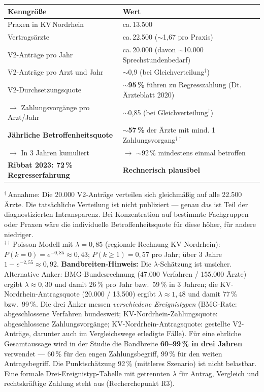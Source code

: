 \documentclass{umbruch-position}
\begin{document}
{\small
\begin{tabularx}{\textwidth}{p{6cm} X}
\toprule
\textbf{Kenngröße} & \textbf{Wert} \\
\midrule
Praxen in KV\,Nordrhein & ca.\,13.500 \\
Vertragsärzte & ca.\,22.500 ($\sim$1,67 pro Praxis) \\
V2-Anträge pro Jahr & ca.\,20.000 (davon $\sim$10.000 Sprechstundenbedarf) \\
V2-Anträge pro Arzt und Jahr & $\sim$0,9 (bei Gleichverteilung$^\dagger$) \\
\addlinespace
V2-Durchsetzungsquote & \textbf{$\sim$95\,\%} führen zu Regresszahlung (Dt.\,Ärzteblatt 2020) \\
$\to$ Zahlungsvorgänge pro Arzt/Jahr & $\sim$0,85 (bei Gleichverteilung$^\dagger$) \\
\addlinespace
\textbf{Jährliche Betroffenheitsquote} & \textbf{$\sim$57\,\%} der Ärzte mit mind. 1 Zahlungsvorgang$^{\dagger\dagger}$ \\
$\to$ In 3 Jahren kumuliert & $\to$ $\sim$92\,\% mindestens einmal betroffen \\
\addlinespace
\textbf{Ribbat 2023: 72\,\% Regresserfahrung} & \textbf{Rechnerisch plausibel} \\
\bottomrule
\end{tabularx}

$^\dagger$\,Annahme: Die 20.000 V2-Anträge verteilen sich gleichmäßig auf alle 22.500 Ärzte. Die tatsächliche Verteilung ist nicht publiziert --- genau das ist Teil der diagnostizierten Intransparenz. Bei Konzentration auf bestimmte Fachgruppen oder Praxen wäre die individuelle Betroffenheitsquote für diese höher, für andere niedriger.\\
$^{\dagger\dagger}$\,Poisson-Modell mit $\lambda = 0{,}85$ (regionale Rechnung KV Nordrhein): $P(k{=}0) = e^{-0{,}85} \approx 0{,}43$; $P(k{\geq}1) = 0{,}57$ pro Jahr; \"uber 3 Jahre $1 - e^{-2{,}55} \approx 0{,}92$. \textbf{Bandbreiten-Hinweis:} Die $\lambda$-Sch\"atzung ist unsicher. Alternative Anker: BMG-Bundesrechnung (47.000 Verfahren / 155.000 \"Arzte) ergibt $\lambda \approx 0{,}30$ und damit 26\,\% pro Jahr bzw.\ 59\,\% in 3 Jahren; die KV-Nordrhein-Antragsquote (20.000 / 13.500) ergibt $\lambda \approx 1{,}48$ und damit 77\,\% bzw.\ 99\,\%. Die drei \"Anker messen \textit{verschiedene Ereignistypen} (BMG-Rate: abgeschlossene Verfahren bundesweit; KV-Nordrhein-Zahlungsquote: abgeschlossene Zahlungsvorg\"ange; KV-Nordrhein-Antragsquote: gestellte V2-Antr\"age, darunter auch im Vergleichswege erledigte F\"alle). F\"ur eine ehrliche Gesamtaussage wird in der Studie die Bandbreite \textbf{60--99\,\% in drei Jahren} verwendet --- 60\,\% f\"ur den engen Zahlungsbegriff, 99\,\% f\"ur den weiten Antragsbegriff. Die Punktsch\"atzung 92\,\% (mittleres Szenario) ist nicht belastbar. Eine formale Drei-Ereignistyp-Tabelle mit getrennten $\lambda$ f\"ur Antrag, Vergleich und rechtskr\"aftige Zahlung steht aus (Recherchepunkt R3).
}
\end{document}
